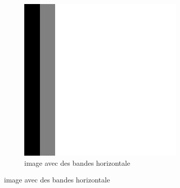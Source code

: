 \documentclass[a4paper,10pt]{article}
\begin{document}
\begin{figure}[ht]
     \centering
     \begin{subfigure}[b]{.25\textwidth}
         \centering
         \includegraphics[scale=0.3]{whitheBlackH.png}
         \caption{image avec des bandes horizontale }



\end{subfigure}
\end{figure}
\end{document}
